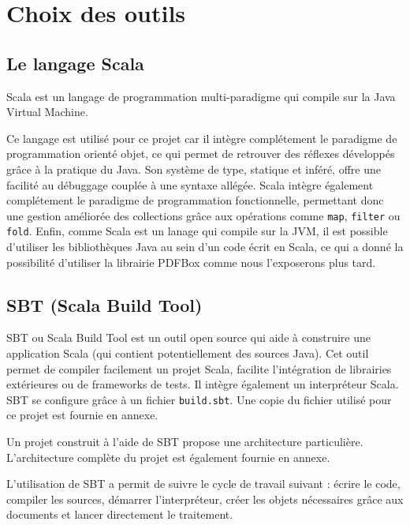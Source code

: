 \section{Choix des outils}

\subsection{Le langage Scala}

Scala est un langage de programmation multi-paradigme qui compile sur la Java Virtual Machine.

Ce langage est utilisé pour ce projet car il intègre complétement le paradigme de programmation orienté objet, ce qui permet de retrouver des réflexes développés grâce à la pratique du Java. Son système de type, statique et inféré, offre une facilité au débuggage couplée à une syntaxe allégée. Scala intègre également complétement le paradigme de programmation fonctionnelle, permettant donc une gestion améliorée des collections grâce aux opérations comme \verb|map|, \verb|filter| ou \verb|fold|. Enfin, comme Scala est un lanage qui compile sur la JVM, il est possible d'utiliser les bibliothèques Java au sein d'un code écrit en Scala, ce qui a donné la possibilité d'utiliser la librairie PDFBox comme nous l'exposerons plus tard.

\subsection{SBT (Scala Build Tool)}

SBT ou Scala Build Tool est un outil open source qui aide à construire une application Scala (qui contient potentiellement des sources Java). Cet outil permet de compiler facilement un projet Scala, facilite l'intégration de librairies extérieures ou de frameworks de tests. Il intègre également un interpréteur Scala. SBT se configure grâce à un fichier \verb|build.sbt|. Une copie du fichier utilisé pour ce projet est fournie en annexe.

Un projet construit à l'aide de SBT propose une architecture particulière. L'architecture complète du projet est également fournie en annexe.

L'utilisation de SBT a permit de suivre le cycle de travail suivant : écrire le code, compiler les sources, démarrer l'interpréteur, créer les objets nécessaires grâce aux documents et lancer directement le traitement.
